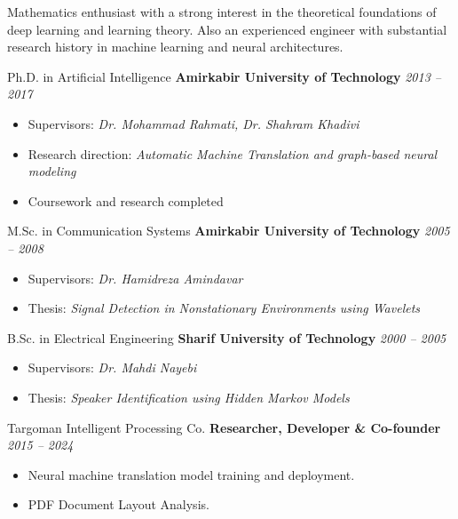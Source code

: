 \documentclass[11pt, a4paper]{awesome-cv}
\begin{document}
\makecvheader

\newcommand{\cvevent}[3]{#1 \textbf{#2} \textit{#3}}


Mathematics enthusiast with a strong interest in the theoretical foundations of
deep learning and learning theory. Also an experienced engineer with
substantial research history in machine learning and neural architectures.


\cvevent
{Ph.D. in Artificial Intelligence}
{Amirkabir University of Technology}
{2013 -- 2017}
{}
{
  \begin{itemize}
    \item Supervisors: \textit{Dr. Mohammad Rahmati, Dr. Shahram Khadivi}
    \item Research direction: \textit{Automatic Machine Translation and graph-based
            neural modeling}
    \item Coursework and research completed
  \end{itemize}
}

\cvevent
{M.Sc. in Communication Systems}
{Amirkabir University of Technology}
{2005 -- 2008}
{}
{
  \begin{itemize}
    \item Supervisors: \textit{Dr. Hamidreza Amindavar}
    \item Thesis: \textit{Signal Detection in Nonstationary Environments using Wavelets}
  \end{itemize}
}

\cvevent
{B.Sc. in Electrical Engineering}
{Sharif University of Technology}
{2000 -- 2005}
{}
{
  \begin{itemize}
    \item Supervisors: \textit{Dr. Mahdi Nayebi}
    \item Thesis: \textit{Speaker Identification using Hidden Markov Models}
  \end{itemize}
}


\cvevent
{Targoman Intelligent Processing Co.}
{Researcher, Developer \& Co-founder}
{2015 -- 2024}
{}
{
  \begin{itemize}
    \item Neural machine translation model training and deployment.
    \item PDF Document Layout Analysis.
  \end{itemize}
}
\end{document}
